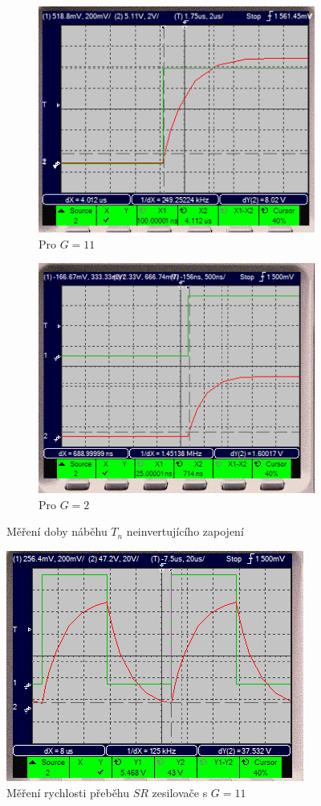 \documentclass[twoside]{article}
\begin{document}
\begin{figure}
    \centering
    \begin{subfigure}{0.45\textwidth}
        \centering
        
        \includegraphics[width=0.8\linewidth]{neinv_rise_time_11.png}
        \caption{Pro $G=11$}
        \label{fig:neinv_rise_time_11}
    \end{subfigure}
    \begin{subfigure}{0.45\textwidth}
        \centering
        \includegraphics[width=0.8\linewidth]{neinv_rise_time_2.png}
        \caption{Pro $G=2$}
        \label{fig:neinv_rise_time_2}
    \end{subfigure}
    \caption{Měření doby náběhu $T_n$ neinvertujícího zapojení}
\end{figure}


\begin{figure}[h!]
    \centering
    \includegraphics[width=0.50\linewidth]{neinv_slew_rate.png}
    \caption{Měření rychlosti přeběhu $SR$ zesilovače s $G=11$}
    \label{fig:neinv_slew_rate}
\end{figure}
\end{document}
